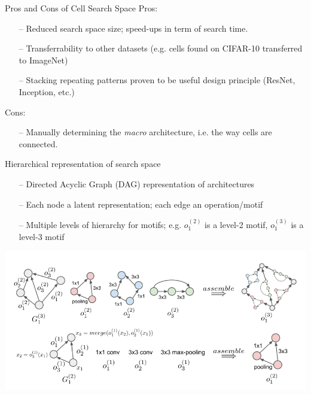\begin{frame}[c]{Pros and Cons of Cell Search Space}
\centering
\alert{Pros:}
\begin{itemize}
	\item[--] Reduced search space size; speed-ups in term of search time.
	\item[--] Transferrability to other datasets (e.g. cells found on
	CIFAR-10 transferred to ImageNet)
	\item[--] Stacking repeating patterns proven to be useful design principle 
	(ResNet, Inception, etc.)
\end{itemize}
\pause
\alert{Cons:}
\begin{itemize}
	\item[--] Manually determining the \textit{macro} architecture, 
	i.e. the way cells are connected.
\end{itemize}

\end{frame}
\begin{frame}[c]{Hierarchical representation of search space }
\centering
\begin{itemize}
	\item[--] Directed Acyclic Graph (DAG) representation of architectures
	\item[--] Each node a latent representation; each edge an operation/motif
	\item[--] Multiple levels of hierarchy for motifs; e.g. $o_1^{(2)}$ is a level-2 motif, 
	$o_1^{(3)}$ is a level-3 motif
\end{itemize}
\includegraphics[width=\textwidth]{images_lec7/hierarchical_nas.png}\\
\end{frame}


